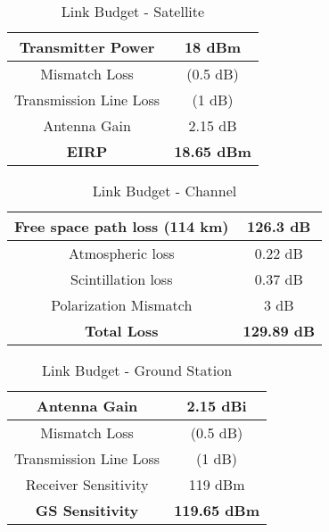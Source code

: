 \begin{table}[!htb]
  \centering
  \renewcommand{\arraystretch}{1.2}
  \begin{tabular}{ |c|c| }
  \hline
  Transmitter Power             & 18 dBm                    \\ \hline
  Mismatch Loss                 & (0.5 dB)                 \\ \hline
  Transmission Line Loss        & (1 dB)                  \\ \hline
  Antenna Gain                  & 2.15 dB                   \\ \hline
  \textbf{EIRP}                 & \textbf{18.65 dBm}        \\ \hline
  \end{tabular}
  \caption{Link Budget - Satellite}
  \label{tab:link_budget_satellite}
\end{table}

\begin{table}[!htb]
  \centering
  \renewcommand{\arraystretch}{1.2}
  \begin{tabular}{ |c|c| }
  \hline
  Free space path loss (114 km) & 126.3 dB                  \\ \hline
  Atmospheric loss              & 0.22 dB                   \\ \hline
  Scintillation loss            & 0.37 dB                   \\ \hline
  Polarization Mismatch         & 3 dB                      \\ \hline
  \textbf{Total Loss}           & \textbf{129.89 dB}         \\ \hline
  \end{tabular}
  \caption{Link Budget - Channel}
  \label{tab:link_budget_channel}
\end{table}

\begin{table}[!htb]
  \centering
  \renewcommand{\arraystretch}{1.2}
  \begin{tabular}{ |c|c| }
  \hline
  Antenna Gain                  & 2.15 dBi                \\ \hline
  Mismatch Loss                 & (0.5 dB)                \\ \hline
  Transmission Line Loss        & (1 dB)                  \\ \hline
  Receiver Sensitivity          & 119 dBm                 \\ \hline
  \textbf{GS Sensitivity}       & \textbf{119.65 dBm}     \\ \hline
  \end{tabular}
  \caption{Link Budget - Ground Station}
  \label{tab:link_budget_gs}
\end{table}


